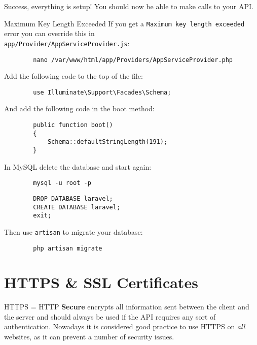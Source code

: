 Success, everything is setup! You should now be able to make calls to your API.

\pagebreak

\begin{infobox}{Maximum Key Length Exceeded}
    If you get a \texttt{Maximum key length exceeded} error you can override this in\\ \texttt{app/Provider/AppServiceProvider.js}:

    \begin{verbatim}
        nano /var/www/html/app/Providers/AppServiceProvider.php
    \end{verbatim}

    Add the following code to the top of the file:

    \begin{verbatim}
        use Illuminate\Support\Facades\Schema;
    \end{verbatim}

    And add the following code in the boot method:

    \begin{verbatim}
        public function boot()
        {
            Schema::defaultStringLength(191);
        }
    \end{verbatim}

    In MySQL delete the database and start again:

    \begin{verbatim}
        mysql -u root -p
    \end{verbatim}

    \begin{verbatim}
        DROP DATABASE laravel;
        CREATE DATABASE laravel;
        exit;
    \end{verbatim}

    Then use \texttt{artisan} to migrate your database:

    \begin{verbatim}
        php artisan migrate
    \end{verbatim}
\end{infobox}


\section{HTTPS \& SSL Certificates}

HTTPS = HTTP \textbf{Secure} encrypts all information sent between the client and the server and should always be used if the API requires any sort of authentication. Nowadays it is considered good practice to use HTTPS on \textit{all} websites, as it can prevent a number of security issues.
\\

